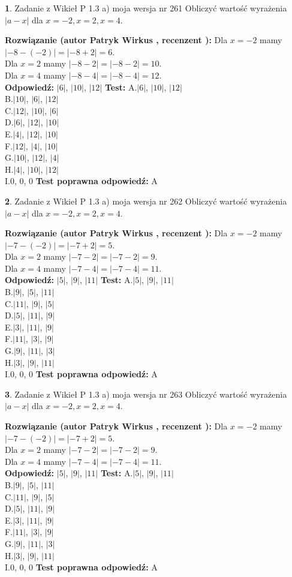 \documentclass[12pt, a4paper]{article}
\theoremstyle{definition} %
\newtheorem{zad}{}
\newcommand{\zadStart}[1]{\begin{zad}#1\newline}
\newcommand{\zadStop}{\end{zad}}
\newcommand{\rozwStart}[2]{\noindent \textbf{Rozwiązanie (autor #1 , recenzent #2): }\newline}
\newcommand{\rozwStop}{\newline}
\newcommand{\odpStart}{\noindent \textbf{Odpowiedź:}\newline}
\newcommand{\odpStop}{\newline}
\newcommand{\testStart}{\noindent \textbf{Test:}\newline}
\newcommand{\testStop}{\newline}
\newcommand{\kluczStart}{\noindent \textbf{Test poprawna odpowiedź:}\newline}
\newcommand{\kluczStop}{\newline}
\begin{document}
\zadStart{Zadanie z Wikieł P 1.3 a) moja wersja nr 261}
Obliczyć wartość wyrażenia $|a - x|$ dla $x=-2,x=2,x=4$.
\zadStop
\rozwStart{Patryk Wirkus}{}
Dla $x = -2$ mamy $|-8 - (-2)| = |-8 + 2| = 6$.\\
Dla $x = 2$ mamy $|-8 - 2| = |-8 - 2| = 10$.\\
Dla $x = 4$ mamy $|-8 - 4| = |-8 - 4| = 12$.\\
\rozwStop
\odpStart
$|6|$, $|10|$, $|12|$
\odpStop
\testStart
A.$|6|$, $|10|$, $|12|$\\
B.$|10|$, $|6|$, $|12|$\\
C.$|12|$, $|10|$, $|6|$\\
D.$|6|$, $|12|$, $|10|$\\
E.$|4|$, $|12|$, $|10|$\\
F.$|12|$, $|4|$, $|10|$\\
G.$|10|$, $|12|$, $|4|$\\
H.$|4|$, $|10|$, $|12|$\\
I.$0$, $0$, $0$
\testStop
\kluczStart
A
\kluczStop



\zadStart{Zadanie z Wikieł P 1.3 a) moja wersja nr 262}
Obliczyć wartość wyrażenia $|a - x|$ dla $x=-2,x=2,x=4$.
\zadStop
\rozwStart{Patryk Wirkus}{}
Dla $x = -2$ mamy $|-7 - (-2)| = |-7 + 2| = 5$.\\
Dla $x = 2$ mamy $|-7 - 2| = |-7 - 2| = 9$.\\
Dla $x = 4$ mamy $|-7 - 4| = |-7 - 4| = 11$.\\
\rozwStop
\odpStart
$|5|$, $|9|$, $|11|$
\odpStop
\testStart
A.$|5|$, $|9|$, $|11|$\\
B.$|9|$, $|5|$, $|11|$\\
C.$|11|$, $|9|$, $|5|$\\
D.$|5|$, $|11|$, $|9|$\\
E.$|3|$, $|11|$, $|9|$\\
F.$|11|$, $|3|$, $|9|$\\
G.$|9|$, $|11|$, $|3|$\\
H.$|3|$, $|9|$, $|11|$\\
I.$0$, $0$, $0$
\testStop
\kluczStart
A
\kluczStop



\zadStart{Zadanie z Wikieł P 1.3 a) moja wersja nr 263}
Obliczyć wartość wyrażenia $|a - x|$ dla $x=-2,x=2,x=4$.
\zadStop
\rozwStart{Patryk Wirkus}{}
Dla $x = -2$ mamy $|-7 - (-2)| = |-7 + 2| = 5$.\\
Dla $x = 2$ mamy $|-7 - 2| = |-7 - 2| = 9$.\\
Dla $x = 4$ mamy $|-7 - 4| = |-7 - 4| = 11$.\\
\rozwStop
\odpStart
$|5|$, $|9|$, $|11|$
\odpStop
\testStart
A.$|5|$, $|9|$, $|11|$\\
B.$|9|$, $|5|$, $|11|$\\
C.$|11|$, $|9|$, $|5|$\\
D.$|5|$, $|11|$, $|9|$\\
E.$|3|$, $|11|$, $|9|$\\
F.$|11|$, $|3|$, $|9|$\\
G.$|9|$, $|11|$, $|3|$\\
H.$|3|$, $|9|$, $|11|$\\
I.$0$, $0$, $0$
\testStop
\kluczStart
A
\kluczStop
\end{document}

